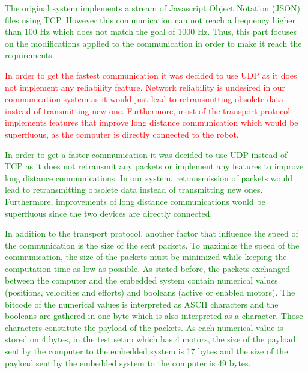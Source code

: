 \textcolor{green}{The original system implements a stream of Javascript Object Notation (JSON)\cite{JSON_IETF} files using TCP. However this communication can not reach a frequency higher than 100 Hz which does not match the goal of 1000 Hz. Thus, this part focuses on the modifications applied to the communication in order to make it reach the requirements.

\textcolor{red}{In order to get the fastest communication it was decided to use UDP as it does not implement any reliability feature. Network reliability is undesired in our communication system as it would just lead to retransmitting obsolete data instead of transmitting new one. Furthermore, most of the transport protocol implements features that improve long distance communication which would be superfluous, as the computer is directly connected to the robot.}
 
\textcolor{green}{In order to get a faster communication it was decided to use UDP instead of TCP as it does not retransmit any packets or implement any features to improve long distance communications. In our system, retransmission of packets would lead to retransmitting obsolete data instead of transmitting new ones. Furthermore, improvements of long distance communications would be superfluous since the two devices are directly connected.}

{\color{red}In addition to the transport protocol, another factor that influence the speed of the communication is the size of the sent packets. To maximize the speed of the communication, the size of the packets must be minimized while keeping the computation time as low as possible. As stated before, the packets exchanged between the computer and the embedded system contain numerical values (positions, velocities and efforts) and booleans (active or enabled motors). The bitcode of the numerical values is interpreted as ASCII characters and the booleans are gathered in one byte which is also interpreted as a character. Those characters constitute the payload of the packets. As each numerical value is stored on 4 bytes, in the test setup which has 4 motors, the size of the payload sent by the computer to the embedded system is 17 bytes and the size of the payload sent by the embedded system to the computer is 49 bytes.}

}
